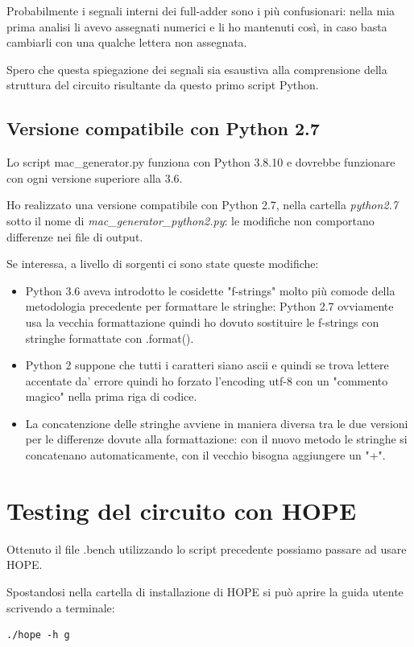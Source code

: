 \documentclass[12pt, letterpaper]{article}
\begin{document}
Probabilmente i segnali interni dei full-adder sono i più confusionari: nella mia prima analisi li avevo assegnati numerici e li ho mantenuti così, in caso basta cambiarli con una qualche lettera non assegnata.

Spero che questa spiegazione dei segnali sia esaustiva alla comprensione della struttura del circuito risultante da questo primo script Python.

\subsection{Versione compatibile con Python 2.7}

Lo script mac\_generator.py funziona con Python 3.8.10 e dovrebbe funzionare con ogni versione superiore alla 3.6.

Ho realizzato una versione compatibile con Python 2.7, nella cartella \textit{python2.7} sotto il nome di \textit{mac\_generator\_python2.py}: le modifiche non comportano differenze nei file di output.

Se interessa, a livello di sorgenti ci sono state queste modifiche:
\begin{itemize}
\item Python 3.6 aveva introdotto le cosidette "f-strings" molto più comode della metodologia precedente per formattare le stringhe: Python 2.7 ovviamente usa la vecchia formattazione quindi ho dovuto sostituire le f-strings con stringhe formattate con .format().
\item Python 2 suppone che tutti i caratteri siano ascii e quindi se trova lettere accentate da' errore quindi ho forzato l'encoding utf-8 con un "commento magico" nella prima riga di codice.
\item La concatenzione delle stringhe avviene in maniera diversa tra le due versioni per le differenze dovute alla formattazione: con il nuovo metodo le stringhe si concatenano automaticamente, con il vecchio bisogna aggiungere un "+".
\end{itemize}

\section{Testing del circuito con HOPE}

Ottenuto il file .bench utilizzando lo script precedente possiamo passare ad usare HOPE.

Spostandosi nella cartella di installazione di HOPE si può aprire la guida utente scrivendo a terminale:
\begin{lstlisting}
./hope -h g
\end{lstlisting}
\end{document}
